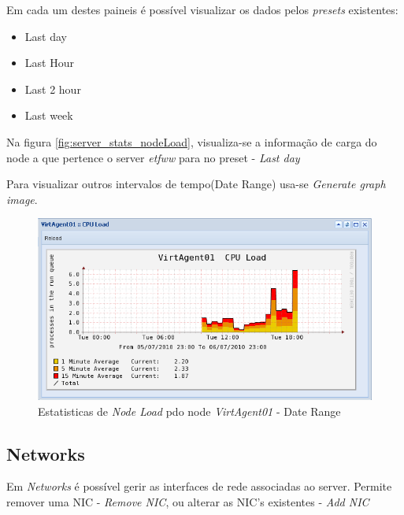 Em cada um destes paineis é possível visualizar os dados pelos \emph{presets} existentes:
\begin{itemize}
	\item Last day
	\item Last Hour
	\item Last 2 hour
	\item Last week
\end{itemize}

Na figura \ref{fig:server_stats_nodeLoad}, visualiza-se a informação de carga do node a que pertence o server \emph{etfww} para no preset - \emph{Last day}

Para visualizar outros intervalos de tempo(Date Range) usa-se \emph{Generate graph image}.
\begin{figure}[H]
	\begin{center}
	\includegraphics[scale=0.5]{screenshots/server_stats_nodeLoadRange.png}
	\caption{Estatisticas de \emph{Node Load} pdo node \emph{VirtAgent01} - Date Range}
	\label{fig:server_stats_nodeLoadRange}
	\end{center}
\end{figure}

\subsection{Networks}

Em \emph{Networks} é possível gerir as interfaces de rede associadas ao server.
Permite remover uma NIC - \emph{Remove NIC}, ou alterar as NIC's existentes - \emph{Add NIC}

